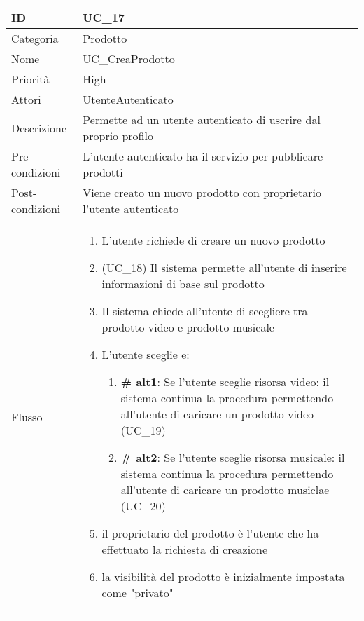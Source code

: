 \begin{center}
\begin{tabular}{ |p{2cm}|p{13cm}|  }
\hline
ID & UC\_17\\\hline
Categoria & Prodotto \\\hline
Nome & UC\_CreaProdotto \\\hline
Priorità & High \\\hline
Attori &  UtenteAutenticato \\\hline
Descrizione & Permette ad un utente autenticato di uscrire dal proprio profilo \\\hline
Pre-condizioni &  L'utente autenticato ha il servizio per pubblicare prodotti\\\hline
Post-condizioni &  Viene creato un nuovo prodotto con proprietario l'utente autenticato\\\hline
Flusso &  	\begin{enumerate}
			\item L'utente richiede di creare un nuovo prodotto
			\item (UC\_18) Il sistema permette all'utente di inserire informazioni di base sul prodotto
			\item Il sistema chiede all'utente di scegliere tra prodotto video e prodotto musicale
			\item L'utente sceglie e:
			\begin{enumerate}[  ]
				\item \textbf{\# alt1}: Se l'utente sceglie risorsa video: il sistema continua la procedura permettendo all'utente di caricare un prodotto video (UC\_19)
				\item \textbf{\# alt2}: Se l'utente sceglie risorsa musicale: il sistema continua la procedura permettendo all'utente di caricare un prodotto musiclae (UC\_20)
			\end{enumerate}
			\item il proprietario del prodotto è l'utente che ha effettuato la richiesta di creazione
			\item la visibilità del prodotto è inizialmente impostata come "privato"
		\end{enumerate}\\\hline
\end{tabular}
\label{table_use_case:17}\newline


\end{center}
